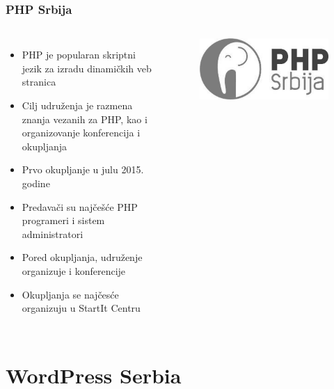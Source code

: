 \documentclass[hyperref={bookmarks=false},aspectratio=169]{beamer}
\begin{document}
\begin{frame}
\frametitle{PHP Srbija}

\begin{columns}[T]

\begin{itemize}
    \item PHP je popularan skriptni jezik za izradu dinamičkih veb stranica 
    \item Cilj udruženja je razmena znanja vezanih za PHP, kao i organizovanje konferencija i okupljanja
    \item Prvo okupljanje u julu 2015. godine
    \item Predavači su najčešće PHP programeri i sistem administratori
    \item Pored okupljanja, udruženje organizuje i konferencije
    \item Okupljanja se najčesće organizuju u StartIt Centru
    
\end{itemize}

\begin{figure}
    \raggedleft
    \includegraphics[scale=0.15]{./images/php_gray.jpg}
\end{figure}

\end{columns}

\end{frame}

\section{WordPress Serbia}
\end{document}
